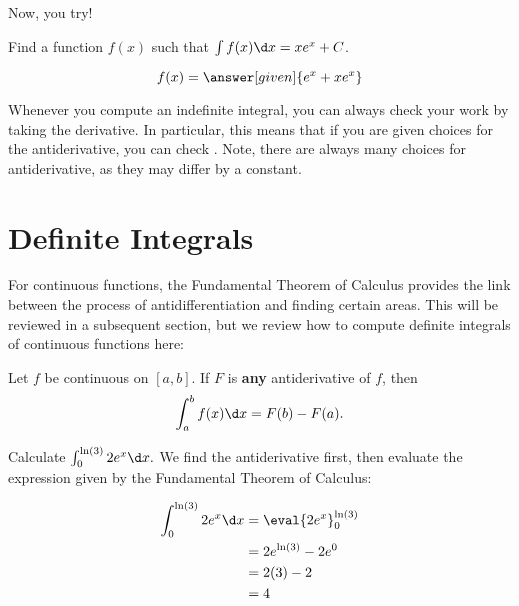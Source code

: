 \documentclass[nooutcomes]{ximera}
\begin{document}
Now, you try!

\begin{question} 
  Find a function $f(x)$ such that $\int f(x) \d x = xe^x +C$.

  \begin{prompt} 
    \[
    f(x) = \answer[given]{e^x + xe^x}
    \]
  \end{prompt}
\end{question}

Whenever you compute an indefinite integral, you can always check your
work by taking the derivative. In particular, this means that if you
are given choices for the antiderivative, you can check . Note, there are always many choices for
antiderivative, as they may differ by a constant.



\section{Definite Integrals}
For continuous functions, the Fundamental Theorem of Calculus provides the link between the process of antidifferentiation and finding certain areas.  This will be reviewed in a subsequent section, but we review how to compute definite integrals of continuous functions here:

\begin{theorem}
  Let $f$ be continuous on $[a,b]$. If $F$ is \textbf{any}
  antiderivative of $f$, then
  \[
  \int_a^b f(x)\d x = F(b)-F(a).
  \]
\end{theorem}

\begin{example}
Calculate $\int_0^{\ln(3)} 2e^x \d x.$  We find the antiderivative first, then evaluate the expression given by the Fundamental Theorem of Calculus:

\begin{align*}
\int_0^{\ln(3)} 2e^x \d x &= \eval{2e^x}_0^{\ln(3)} \\
&= 2e^{\ln(3)}-2e^0 \\
&= 2(3) -2 \\
&= 4
\end{align*}
\end{example}
\end{document}
